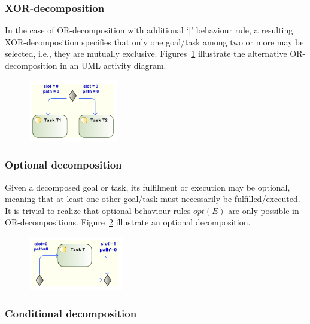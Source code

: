 \subsubsection{XOR-decomposition}

In the case of OR-decomposition with additional `|' behaviour rule, a resulting XOR-decomposition specifies that only one goal/task among two or more may be selected, i.e., they are mutually exclusive. Figures~\ref{fig:UML_ALT_TSKS} illustrate the alternative OR-decomposition in an UML activity diagram.

\begin{figure}[ht!]
\centering
\includegraphics[width=0.35\textwidth]{imgs/UML_ALT_TSKS.png}
\caption{}
\label{fig:UML_ALT_TSKS}
\end{figure}

\subsubsection{Optional decomposition}

Given a decomposed goal or task, its fulfilment or execution may be optional, meaning that at least one other goal/task must necessarily be fulfilled/executed. It is trivial to realize that optional behaviour rules $opt(E)$ are only possible in OR-decompositions. Figure~\ref{fig:UML_OPT_TSK} illustrate an optional decomposition.

\begin{figure}[ht!]
\centering
\includegraphics[width=0.37\textwidth]{imgs/UML_OPT_TSK.png}
\caption{}
\label{fig:UML_OPT_TSK}
\end{figure}

\subsubsection{Conditional decomposition}

